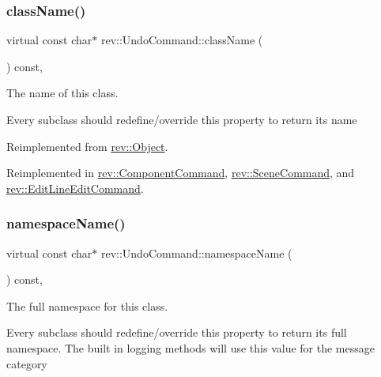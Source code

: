 \subsubsection{\texorpdfstring{className()}{className()}}
{\footnotesize\ttfamily virtual const char$\ast$ rev\+::\+Undo\+Command\+::class\+Name (\begin{DoxyParamCaption}{ }\end{DoxyParamCaption}) const\hspace{0.3cm}{\ttfamily [inline]}, {\ttfamily [virtual]}}



The name of this class. 

Every subclass should redefine/override this property to return its name 

Reimplemented from \mbox{\hyperlink{classrev_1_1_object_a7a2013f91169479b65cf93afdc5d9a68}{rev\+::\+Object}}.



Reimplemented in \mbox{\hyperlink{classrev_1_1_component_command_a9fa769c52b149facb70c80bbc03a2be0}{rev\+::\+Component\+Command}}, \mbox{\hyperlink{classrev_1_1_scene_command_a9b9126f306b1775c4f74ffb8b1a49dc5}{rev\+::\+Scene\+Command}}, and \mbox{\hyperlink{classrev_1_1_edit_line_edit_command_a08cedca4363770f54736cec4f35db942}{rev\+::\+Edit\+Line\+Edit\+Command}}.

\mbox{\label{classrev_1_1_undo_command_aea7ceb3f5ea266e697f01a65da7afec5}} 
\subsubsection{\texorpdfstring{namespaceName()}{namespaceName()}}
{\footnotesize\ttfamily virtual const char$\ast$ rev\+::\+Undo\+Command\+::namespace\+Name (\begin{DoxyParamCaption}{ }\end{DoxyParamCaption}) const\hspace{0.3cm}{\ttfamily [inline]}, {\ttfamily [virtual]}}



The full namespace for this class. 

Every subclass should redefine/override this property to return its full namespace. The built in logging methods will use this value for the message category 

